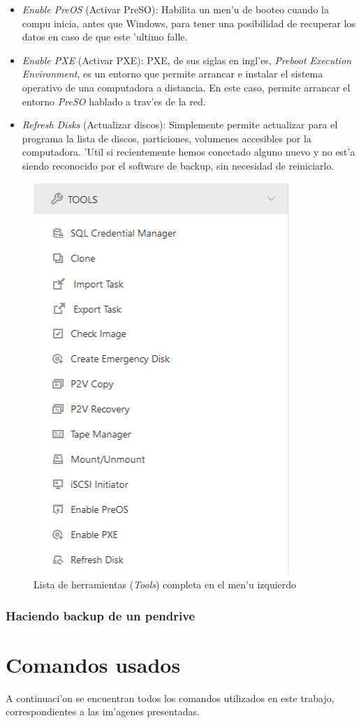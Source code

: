 \documentclass[11pt]{article}
\begin{document}
\begin{itemize}
		\item \textit{Enable PreOS} (Activar PreSO): Habilita un men'u de booteo cuando la compu inicia, antes que Windows, para tener una posibilidad de recuperar los datos en caso de que este 'ultimo falle.
		\item \textit{Enable PXE} (Activar PXE): PXE, de sus siglas en ingl'es, \textit{Preboot Execution Environment}, es un entorno que permite arrancar e instalar el sistema operativo de una computadora a distancia. En este caso, permite arrancar el entorno \textit{PreSO} hablado a trav'es de la red.
		\item \textit{Refresh Disks} (Actualizar discos): Simplemente permite actualizar para el programa la lista de discos, particiones, volumenes accesibles por la computadora. 'Util si recientemente hemos conectado alguno nuevo y no est'a siendo reconocido por el software de backup, sin necesidad de reiniciarlo.
	\end{itemize}
	
	\begin{figure}[H]
		\centering
		\includegraphics[width=.34\textwidth]{Images/easeus/use_tools}
		\caption{Lista de herramientas (\textit{Tools}) completa en el men'u izquierdo}
	\end{figure}
	
	\subsubsection{Haciendo backup de un pendrive}

	\newpage
	\section{Comandos usados}
		A continuaci'on se encuentran todos los comandos utilizados en este trabajo, correspondientes a las im'agenes presentadas.
\end{document}
